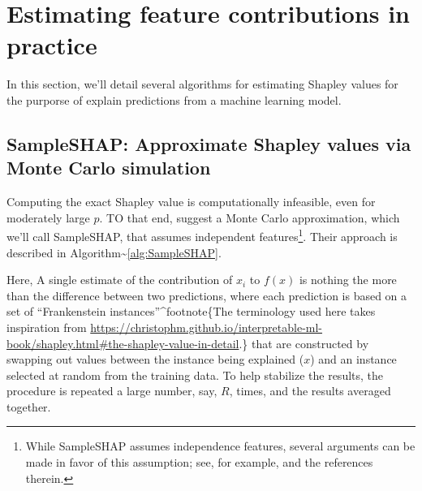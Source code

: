 \section{Estimating feature contributions in practice}

In this section, we'll detail several algorithms for estimating Shapley
values for the purporse of explain predictions from a machine learning
model.

\subsection{SampleSHAP: Approximate Shapley values via Monte Carlo simulation \label{sec:SampleSHAP}}

Computing the exact Shapley value is computationally infeasible, even
for moderately large \(p\). TO that end,
\citet{strumbelj-2014-explaining} suggest a Monte Carlo approximation,
which we'll call SampleSHAP, that assumes independent
features\footnote{While SampleSHAP assumes independence features, several arguments can be made in favor of this assumption; see, for example, \citet{chen-2020-true} and the references therein.}.
Their approach is described in
Algorithm\textasciitilde{}\ref{alg:SampleSHAP}.

Here, A single estimate of the contribution of \(x_i\) to
\(f\left(x\right)\) is nothing the more than the difference between two
predictions, where each prediction is based on a set of ``Frankenstein
instances''\^{}footnote\{The terminology used here takes inspiration
from
\url{https://christophm.github.io/interpretable-ml-book/shapley.html#the-shapley-value-in-detail}.\}
that are constructed by swapping out values between the instance being
explained (\(x\)) and an instance selected at random from the training
data. To help stabilize the results, the procedure is repeated a large
number, say, \(R\), times, and the results averaged together.

